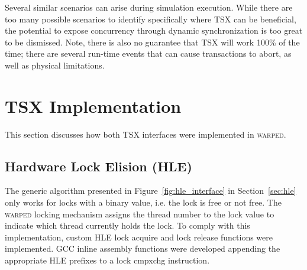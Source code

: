 \documentclass[11pt]{book}
\begin{document}
Several similar scenarios can arise during simulation execution. While there are too many
possible scenarios to identify specifically where TSX can be beneficial, the potential to
expose concurrency through dynamic synchronization is too great to be dismissed. Note,
there is also no guarantee that TSX will work 100\% of the time; there are several
run-time events that can cause transactions to abort, as well as physical limitations.


%
%

\section{TSX Implementation}

This section discusses how both TSX interfaces were implemented in \textsc{warped}.

\subsection{Hardware Lock Elision (HLE)}

The generic algorithm presented in Figure~\ref{fig:hle_interface} in Section~\ref{sec:hle}
only works for locks with a binary value, i.e. the lock is free or not free.  The \textsc{warped}
locking mechanism assigns the thread number to the lock value to indicate which thread
currently holds the lock.  To comply with this implementation, custom HLE lock acquire and
lock release functions were implemented.  GCC inline assembly functions were developed
appending the appropriate HLE prefixes to a lock cmpxchg instruction.
\end{document}
